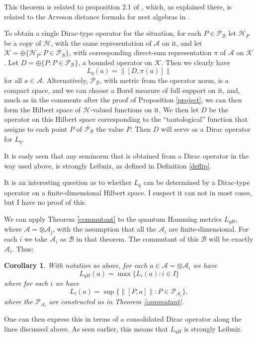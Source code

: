 \documentclass{amsart}[14pt]
\newtheorem{corollary}[theorem]{Corollary}
\theoremstyle{definition}
\theoremstyle{remark}
\newcommand{\cA}{{\mathcal A}}
\newcommand{\cB}{{\mathcal B}}
\newcommand{\cH}{{\mathcal H}}
\newcommand{\cK}{{\mathcal K}}
\newcommand{\cP}{{\mathcal P}}
\newcommand{\<}{\langle}
\renewcommand{\>}{\rangle}
\numberwithin{equation}{section}
\begin{document}
{This theorem is related to proposition 2.1 of \cite{Chr},
which, as explained there, is related to the Arveson
distance formula for nest algebras in \cite{Arv}.

To obtain a single Dirac-type operator for the situation,
for each $P \in  \cP_\cB$ let $\cH_P$ be a copy of
$\cH$, with the same representation of $\cA$ on
it, and let $\cK = \oplus \{\cH_P: P \in  \cP_\cB\}$, with 
corresponding direct-sum representation $\pi$ of $\cA$
on $\cK$. Let $D = \oplus \{ P: P \in  \cP_\cB\}$, 
a bounded operator on $\cK$. Then we clearly have
\[
L_q(a) = \| [D, \pi(a)]\|
\]
for all $a \in \cA$. Alternatively, $ \cP_\cB$, with metric from
the operator norm, is a compact space, and we can choose
a Borel measure of full support on it, and, much as in 
the comments after the proof of Proposition \ref{project}, we can
then form the Hilbert space of $\cH$-valued functions on
it. We then let $D$ be the operator on this Hilbert space
corresponding to the ``tautological'' function that assigns
to each point $P$ of $ \cP_\cB$ the value $P$. 
Then $D$ will serve as a Dirac operator for $L_q$.

It is easly seen that any seminorm that is obtained from
a Dirac operator in the way used above, is strongly
Leibniz, as defined in Definition \ref{deflip}.

It is an interesting question as to whether $L_q$ can
be determined by a Dirac-type operator on a finite-dimensional
Hilbert space. I suspect it can not in most cases, but I have
no proof of this.

We can apply Theorem \ref{commutant} to the quantum Hamming 
metrics $L_{qH}$, where $\cA = \otimes \cA_i$, with the
assumption that all the $\cA_i$ are finite-dimensional. 
For each $i$
we take $\tilde \cA_i$ as $\cB$ in that theorem. The commutant
of this $\cB$ will be exactly $\cA_i$. Thus:
\begin{corollary} 
With notation as above, for each $a \in \cA  = \otimes \cA_i$ we have
\[
L_{qH}(a) = \max \{L_i(a): i \in I\}
\]
where for each $i$ we have
\[
L_i(a) = \sup \{\| [P,a] \|: P \in \cP_{\cA_i} \},
\]
where the $\cP_{\cA_i} $ are constructed as in Theorem \ref{commutant}.
\end{corollary}

One can then express this in terms of a consolidated Dirac operator
along the lines discussed above. As seen earlier, this means
that $L_{qH}$ is strongly Leibniz.


%

}
\end{document}
